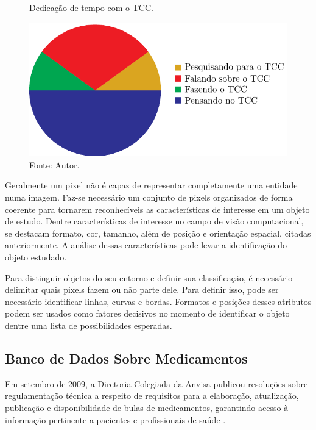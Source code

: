 \begin{figure}[htbp]
    \centering
    \caption{Dedicação de tempo com o TCC.}
    \label{fig:revisao:simbolica}
    \includegraphics{../pictures/simbolica.pdf}
    \caption*{Fonte: Autor.}
\end{figure}

Geralmente um \ac{pixel} não é capaz de representar completamente uma entidade numa imagem.
Faz-se necessário um conjunto de \acp{pixel} organizados de forma coerente para tornarem reconhecíveis as características de interesse em um objeto de estudo.
Dentre características de interesse no campo de visão computacional, se destacam formato, cor, tamanho, além de posição e orientação espacial, citadas anteriormente.
A análise dessas características pode levar a identificação do objeto estudado.

Para distinguir objetos do seu entorno e definir sua classificação, é necessário delimitar quais \acp{pixel} fazem ou não parte dele.
Para definir isso, pode ser necessário identificar linhas, curvas e bordas.
Formatos e posições desses atributos podem ser usados como fatores decisivos no momento de identificar o objeto dentre uma lista de possibilidades esperadas.

\subsection{Banco de Dados Sobre Medicamentos}\label{ssec:db}

Em setembro de 2009, a Diretoria Colegiada da \ac{Anvisa} publicou resoluções sobre regulamentação técnica a respeito de requisitos para a elaboração, atualização, publicação e disponibilidade de bulas de medicamentos, garantindo acesso à informação pertinente a pacientes e profissionais de saúde \cite{anvisa2009RDC}.

